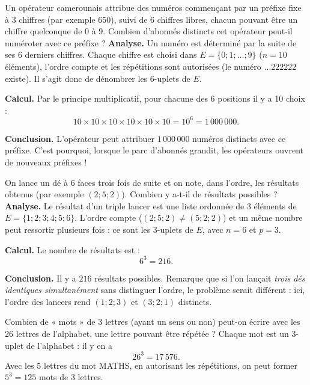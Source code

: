\documentclass[11pt]{article}
\begin{document}
\begin{exoresolu}
Un opérateur camerounais attribue des numéros commençant par un préfixe fixe à 3 chiffres (par exemple 650), suivi de 6 chiffres libres, chacun pouvant être un chiffre quelconque de $0$ à $9$. Combien d'abonnés distincts cet opérateur peut-il numéroter avec ce préfixe ?
\tcblower
\textbf{Analyse.} Un numéro est déterminé par la suite de ses 6 derniers chiffres. Chaque chiffre est choisi dans $E = \{0 ; 1 ; \ldots ; 9\}$ ($n = 10$ éléments), l'ordre compte et les répétitions sont autorisées (le numéro $\ldots 222222$ existe). Il s'agit donc de dénombrer les 6-uplets de $E$.

\textbf{Calcul.} Par le principe multiplicatif, pour chacune des 6 positions il y a 10 choix :
\[ 10 \times 10 \times 10 \times 10 \times 10 \times 10 = 10^6 = 1\,000\,000. \]

\textbf{Conclusion.} L'opérateur peut attribuer $1\,000\,000$ numéros distincts avec ce préfixe. C'est pourquoi, lorsque le parc d'abonnés grandit, les opérateurs ouvrent de nouveaux préfixes !
\end{exoresolu}

\begin{exoresolu}
On lance un dé à 6 faces trois fois de suite et on note, dans l'ordre, les résultats obtenus (par exemple $(2 ; 5 ; 2)$). Combien y a-t-il de résultats possibles ?
\tcblower
\textbf{Analyse.} Le résultat d'un triple lancer est une liste ordonnée de 3 éléments de $E = \{1 ; 2 ; 3 ; 4 ; 5 ; 6\}$. L'ordre compte ($(2;5;2) \neq (5;2;2)$) et un même nombre peut ressortir plusieurs fois : ce sont les 3-uplets de $E$, avec $n = 6$ et $p = 3$.

\textbf{Calcul.} Le nombre de résultats est :
\[ 6^3 = 216. \]

\textbf{Conclusion.} Il y a $216$ résultats possibles. Remarque que si l'on lançait \emph{trois dés identiques simultanément} sans distinguer l'ordre, le problème serait différent : ici, l'ordre des lancers rend $(1;2;3)$ et $(3;2;1)$ distincts.
\end{exoresolu}

\begin{exemplebox}
Combien de « mots » de 3 lettres (ayant un sens ou non) peut-on écrire avec les 26 lettres de l'alphabet, une lettre pouvant être répétée ? Chaque mot est un 3-uplet de l'alphabet : il y en a
\[ 26^3 = 17\,576. \]
Avec les 5 lettres du mot MATHS, en autorisant les répétitions, on peut former $5^3 = 125$ mots de 3 lettres.
\end{exemplebox}
\end{document}
